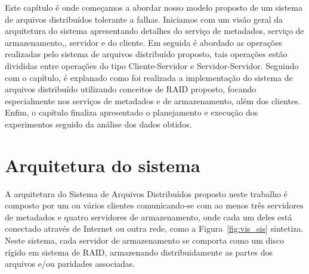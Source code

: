 Este capítulo é onde começamos a abordar nosso modelo proposto de um sistema de arquivos distribuídos tolerante a falhas. Iniciamos com um visão geral da arquitetura do sistema apresentando detalhes do serviço de metadados, serviço de armazenamento,, servidor e do cliente. Em seguida é abordado as operações realizadas pelo sistema de arquivos distribuído proposto, tais operações estão divididas entre operações do tipo Cliente-Servidor e Servidor-Servidor. Seguindo com o capítulo, é explanado como foi realizada a implementação do sistema de arquivos distribuído utilizando conceitos de RAID proposto, focando especialmente nos serviços de metadados e de armazenamento, além dos clientes. Enfim, o capítulo finaliza apresentado o planejamento e execução dos experimentos seguido da análise dos dados obtidos.


	\section{Arquitetura do sistema}
	
	A arquitetura do Sistema de Arquivos Distribuídos proposto neste trabalho é composto por um ou vários clientes comunicando-se com ao menos três servidores de metadados e quatro servidores de armazenamento, onde cada um deles está conectado através de Internet ou outra rede, como a Figura~\ref{fig:vis_sis}  sintetiza. Neste sistema, cada servidor de armazenamento se comporta como um disco rígido em sistema de RAID, armazenando distribuidamente as partes dos arquivos e/ou paridades associadas. \\
	
	

	
	
